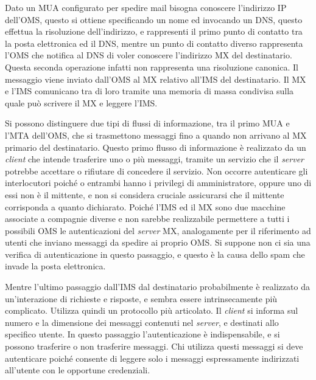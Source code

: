 \documentclass{article}
\numberwithin{equation}{subsection}
\begin{document}
Dato un MUA configurato per spedire mail bisogna conoscere l'indirizzo \textcolor{Bittersweet}{IP} dell'OMS, questo si ottiene specificando un nome ed invocando un \textcolor{Mahogany}{DNS}, questo effettua la risoluzione dell'indirizzo, e rappresenti il primo punto di contatto tra la posta elettronica ed il \textcolor{Mahogany}{DNS}, mentre un punto di contatto diverso rappresenta l'OMS che notifica al \textcolor{Mahogany}{DNS} di voler conoscere l'indirizzo MX del destinatario. Questa seconda operazione infatti non rappresenta una risoluzione canonica. Il messaggio viene inviato dall'OMS al MX relativo all'IMS del destinatario. 
Il MX e l'IMS comunicano tra di loro tramite una memoria di massa condivisa sulla quale può scrivere il MX e leggere l'IMS. 


Si possono distinguere due tipi di flussi di informazione, tra il primo MUA e l'MTA dell'OMS, che si trasmettono messaggi fino a quando non arrivano al MX primario del destinatario. 
Questo primo flusso di informazione è realizzato da un \textit{client} che intende trasferire uno o più messaggi, tramite un servizio che il \textit{server} potrebbe accettare o rifiutare di concedere il servizio. 
Non occorre autenticare gli interlocutori poiché o entrambi hanno i privilegi di amministratore, oppure uno di essi non è il mittente, e non si considera cruciale assicurarsi che il mittente corrisponda a quanto dichiarato. Poiché l'IMS ed il MX sono due macchine associate a compagnie diverse e non sarebbe realizzabile permettere a tutti i possibili OMS le autenticazioni del \textit{server} MX, analogamente per il riferimento ad utenti che inviano messaggi da spedire ai proprio OMS. 
Si suppone non ci sia una verifica di autenticazione in questo passaggio, e questo è la causa dello spam che invade la posta elettronica. 


Mentre l'ultimo passaggio dall'IMS dal destinatario probabilmente è realizzato da un'interazione di richieste e risposte, e sembra essere intrinsecamente più complicato. Utilizza quindi un protocollo più articolato. 
Il \textit{client} si informa sul numero e la dimensione dei messaggi contenuti nel \textit{server}, e destinati allo specifico utente. In questo passaggio l'autenticazione è indispensabile, e si possono trasferire o non trasferire messaggi. 
Chi utilizza questi messaggi si deve autenticare poiché consente di leggere solo i messaggi espressamente indirizzati all'utente con le opportune credenziali. 
\end{document}
